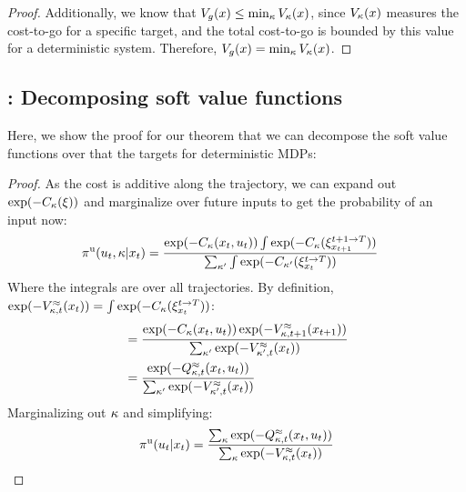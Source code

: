\begin{appendices}
\begin{proof}
Additionally, we know that $V_{g}(x) \leq \min_{\kappa} V_{\kappa}(x)$, since $V_{\kappa}(x)$ measures the cost-to-go for a specific target, and the total cost-to-go is bounded by this value for a deterministic system. Therefore, $V_{g}(x) = \min_{\kappa} V_{\kappa}(x)$.
\end{proof}


\subsection{: Decomposing soft value functions}
Here, we show the proof for our theorem that we can decompose the soft value functions over that the targets for deterministic MDPs:
\softvalfundecompose*

\begin{proof}
As the cost is additive along the trajectory, we can expand out $\exp(-C_{\kappa}(\xi))$ and marginalize over future inputs to get the probability of an input now:
\begin{align*}
  \pi^{\text{u}}(u_t,\kappa| x_t) &= \frac{ \exp(-C_{\kappa}(x_t, u_t)) \int \exp(-C_{\kappa}(\xi_{x_{t+1}}^{t+1 \rightarrow T})) } {\sum_{\kappa'}\int \exp(-C_{\kappa'}(\xi_{x_{t}}^{t \rightarrow T}))} 
\end{align*}
Where the integrals are over all trajectories. By definition, $\exp(-V^{\approx}_{ \kappa,{t}}(x_t)) = \int \exp(-C_{\kappa}(\xi_{x_t}^{t \rightarrow T}))$:
\begin{align*}
  &= \frac{ \exp(-C_{\kappa}(x_t, u_t)) \exp(-V^{\approx}_{ \kappa,{t+1}}(x_{t+1}))} {\sum_{\kappa'} \exp(-V^{\approx}_{\kappa',t}(x_{t}) )} \\
  &= \frac{ \exp(-Q^{\approx}_{ \kappa,{t}}(x_t, u_t))} {\sum_{\kappa'} \exp(-V^{\approx}_{\kappa',t}(x_{t}) )} 
\end{align*}
Marginalizing out $\kappa$ and simplifying:
\begin{align*}
  & \policyuser(\actionuser_t| \staterobot_t) = \frac{\sum_\target \exp( -\qtargsoftt{t}(\staterobot_t, \actionuser_t))} {\sum_{\target} \exp(-\vtargsoftt{t}(\staterobot_{t}) )} \\

\end{align*}
\end{proof}
\end{appendices}
